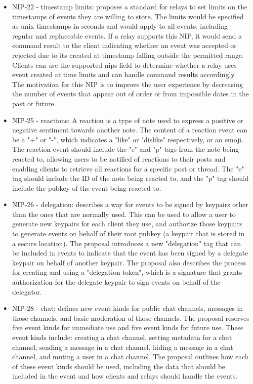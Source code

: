 \begin{itemize}
\item NIP-22 - timestamp limits: proposes a standard for relays to set limits on the timestamps of events they are willing to store. The limits would be specified as unix timestamps in seconds and would apply to all events, including regular and replaceable events. If a relay supports this NIP, it would send a command result to the client indicating whether an event was accepted or rejected due to its created at timestamp falling outside the permitted range. Clients can use the supported nips field to determine whether a relay uses event created at time limits and can handle command results accordingly. The motivation for this NIP is to improve the user experience by decreasing the number of events that appear out of order or from impossible dates in the past or future.
\item NIP-25 - reactions: A reaction is a type of note used to express a positive or negative sentiment towards another note. The content of a reaction event can be a "+" or "-", which indicates a "like" or "dislike" respectively, or an emoji. The reaction event should include the "e" and "p" tags from the note being reacted to, allowing users to be notified of reactions to their posts and enabling clients to retrieve all reactions for a specific post or thread. The "e" tag should include the ID of the note being reacted to, and the "p" tag should include the pubkey of the event being reacted to.
\item NIP-26 - delegation: describes a way for events to be signed by keypairs other than the ones that are normally used. This can be used to allow a user to generate new keypairs for each client they use, and authorize those keypairs to generate events on behalf of their root pubkey (a keypair that is stored in a secure location). The proposal introduces a new "delegation" tag that can be included in events to indicate that the event has been signed by a delegate keypair on behalf of another keypair. The proposal also describes the process for creating and using a "delegation token", which is a signature that grants authorization for the delegate keypair to sign events on behalf of the delegator.
\item NIP-28 - chat: defines new event kinds for public chat channels, messages in those channels, and basic moderation of those channels. The proposal reserves five event kinds for immediate use and five event kinds for future use. These event kinds include: creating a chat channel, setting metadata for a chat channel, sending a message in a chat channel, hiding a message in a chat channel, and muting a user in a chat channel. The proposal outlines how each of these event kinds should be used, including the data that should be included in the event and how clients and relays should handle the events.

\end{itemize}
